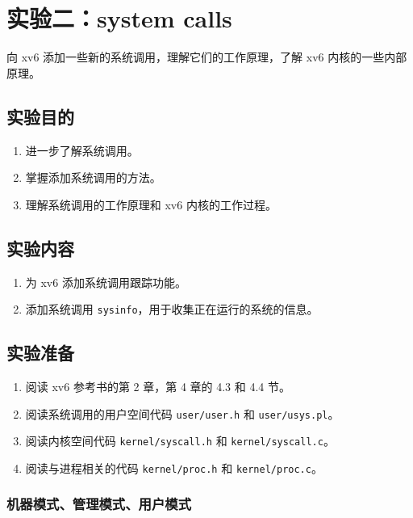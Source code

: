 \section{实验二：system calls}\label{sec:system calls}

向 xv6 添加一些新的系统调用，理解它们的工作原理，了解 xv6 内核的一些内部原理。

\subsection{实验目的}

\begin{enumerate}
	\item 进一步了解系统调用。
	\item 掌握添加系统调用的方法。
	\item 理解系统调用的工作原理和 xv6 内核的工作过程。
\end{enumerate}

\subsection{实验内容}

\begin{enumerate}
	\item 为 xv6 添加系统调用跟踪功能。
	\item 添加系统调用 \texttt{sysinfo}，用于收集正在运行的系统的信息。
\end{enumerate}

\subsection{实验准备}

\begin{enumerate}
	\item 阅读 xv6 参考书的第 2 章，第 4 章的 4.3 和 4.4 节。
	\item 阅读系统调用的用户空间代码 \texttt{user/user.h} 和 \texttt{user/usys.pl}。
	\item 阅读内核空间代码 \texttt{kernel/syscall.h} 和 \texttt{kernel/syscall.c}。
	\item 阅读与进程相关的代码 \texttt{kernel/proc.h} 和 \texttt{kernel/proc.c}。
\end{enumerate}

\subsubsection{机器模式、管理模式、用户模式}

